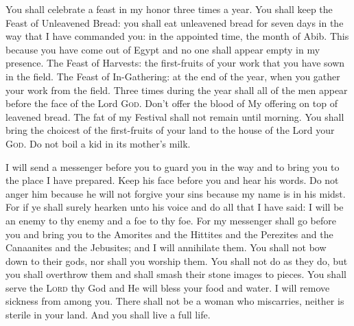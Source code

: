 \begin{inparaenum}
   You shall celebrate a feast in my honor three times a year.%
   You shall keep the Feast of Unleavened Bread: you shall eat unleavened bread for seven days in the way that I have commanded you: in the appointed time, the month of Abib. This because you have come out of Egypt and no one shall appear empty in my presence.%
   The Feast of Harvests: the first-fruits of your work that you have sown in the field. The Feast of In-Gathering: at the end of the year, when you gather your work from the field.%
   Three times during the year shall all of the men appear before the face of the Lord \textsc{God}.%
   Don't offer the blood of My offering on top of leavened bread. The fat of my Festival shall not remain until morning.%
   You shall bring the choicest of the first-fruits of your land to the house of the Lord your \textsc{God}. Do not boil a kid in its mother's milk.%
  
   I will send a messenger before you to guard you in the way and to bring you to the place I have prepared.%
   Keep his face before you and hear his words. Do not anger him because he will not forgive your sins because my name is in his midst.%
   For if ye shall surely hearken unto his voice and do all that I have said: I will be an enemy to thy enemy and a foe to thy foe.%
   For my messenger shall go before you and bring you to the Amorites and the Hittites and the Perezites and the Canaanites and the Jebusites; and I will annihilate them.%
   You shall not bow down to their gods, nor shall you worship them. You shall not do as they do, but you shall overthrow them and shall smash their stone images to pieces.%
   You shall serve the \textsc{Lord} thy God and He will bless your food and water. I will remove sickness from among you.%
   There shall not be a woman who miscarries, neither is sterile in your land. And you shall live a full life.%
  

\end{inparaenum}
